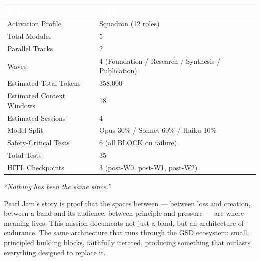 \documentclass[11pt,letterpaper]{article}
\newcommand{\tableheader}[1]{\textbf{\sffamily\textcolor{white}{#1}}}
\begin{document}
\begin{center}
\begin{tabularx}{\textwidth}{L{5cm}X}
\toprule
{}
\tableheader{Metric} & \tableheader{Value} \\
\midrule
Activation Profile & Squadron (12 roles) \\
Total Modules & 5 \\
Parallel Tracks & 2 \\
Waves & 4 (Foundation / Research / Synthesis / Publication) \\
Estimated Total Tokens & 358,000 \\
Estimated Context Windows & 18 \\
Estimated Sessions & 4 \\
Model Split & Opus 30\% / Sonnet 60\% / Haiku 10\% \\
Safety-Critical Tests & 6 (all BLOCK on failure) \\
Total Tests & 35 \\
HITL Checkpoints & 3 (post-W0, post-W1, post-W2) \\
\bottomrule
\end{tabularx}
\end{center}

\vspace{1em}

\begin{quotebox}
\textit{``Nothing has been the same since.''}

\vspace{0.5em}

Pearl Jam's story is proof that the spaces between --- between loss and creation, between a band and its audience, between principle and pressure --- are where meaning lives. This mission documents not just a band, but an architecture of endurance. The same architecture that runs through the GSD ecosystem: small, principled building blocks, faithfully iterated, producing something that outlasts everything designed to replace it.
\end{quotebox}
\end{document}
